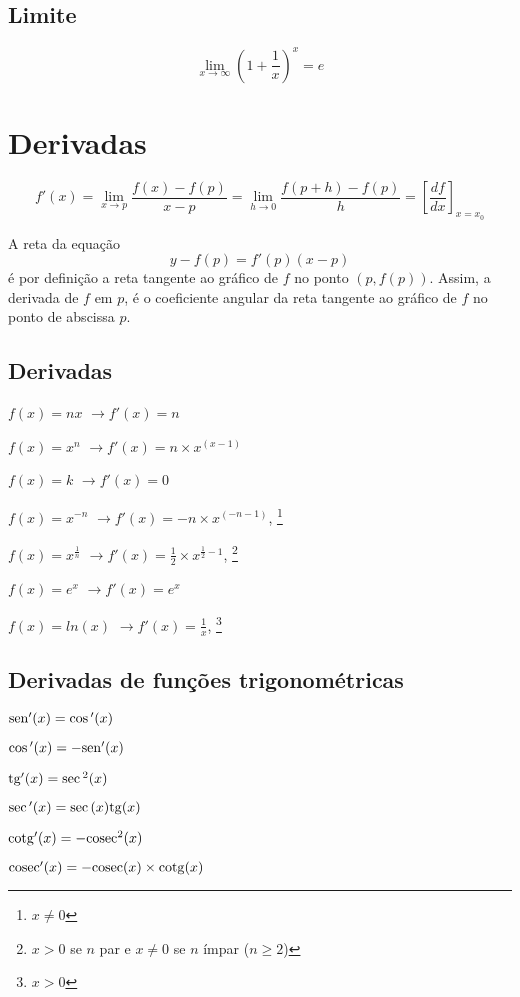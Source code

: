 \documentclass[11pt]{article}
\newcommand{\sen}{{\rm sen}}
\newcommand{\tg}{{\rm tg}}
\newcommand{\cosec}{{\rm cosec}}
\newcommand{\cotg}{{\rm cotg}}
\newcommand{\limit}[3]{{
  \underset{#1 \rightarrow #2}{\lim} #3
}}
\begin{document}
\subsection{Limite}

$$
\limit{x}{\infty}{(1+\frac{1}{x})^x} = e
$$

\section{Derivadas}

$$
f'(x) = \limit{x}{p}{ \frac{f(x) - f(p)}{x-p} =
  \limit{h}{0}{ \frac{f(p+h)- f(p)}{h} } } =
  [\frac{df}{dx}]_{x = x_0}
$$

A reta da equação $$y-f(p)=f'(p)(x-p)$$ é por definição a reta tangente ao
gráfico de $f$ no ponto $(p, f(p))$. Assim, a derivada de $f$ em $p$, é o
coeficiente angular da reta tangente ao gráfico de $f$ no ponto de abscissa
$p$.

\subsection{Derivadas}

\begin{description}
  \begin{multicols}{2}
    \item[ $f(x) = nx$ ]       $ \to f'(x) = n $
    \item[ $f(x) = x^n$ ]      $ \to f'(x) = n\times x^{(x-1)}$
    \item[ $f(x) = k$ ]        $ \to f'(x) = 0$
    \item[ $f(x) = x^{-n}$ ]   $ \to f'(x) = -n\times x^{(-n-1)} $,
      \footnote{$x\neq 0$}
    \item[ $f(x) = x^{ \frac{1}{n} }$ ] $ \to f'(x) = \frac{1}{2} \times
      x^{\frac{1}{2}-1}$,
      \footnote{$x>0$ se $n$ par e $x\neq 0$ se $n$ ímpar ($n\geq2$)}
    \item[ $f(x) = e^x$ ]      $ \to f'(x) = e^x $
    \item[ $f(x) = ln(x)$ ]    $ \to f'(x) = \frac{1}{x}$,
      \footnote{$x>0$}
    \end{multicols}
\end{description}

\subsection{Derivadas de funções trigonométricas}

\begin{itemize}
  \begin{multicols}{2}
    \item $ \sen{'(x)} = \cos{'(x)} $
    \item $ \cos{'(x)} = -\sen{'(x)} $
    \item $ \tg{'(x)} = \sec{^2(x)} $
    \item $ \sec{'(x)} = \sec{(x)}\tg{(x)}$
    \item $ \cotg{'(x)} = -\cosec{^2(x)}$
    \item $ \cosec{'(x)} = -\cosec{(x)}\times \cotg{(x)}$
  \end{multicols}
\end{itemize}
\end{document}
